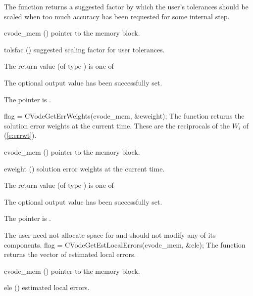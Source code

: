 {
  The function  returns a
  suggested factor by which the user's tolerances 
  should be scaled when too much accuracy has been 
  requested for some internal step.
}
{
  \begin{args}
  \item[cvode\_mem] ()
    pointer to the {\cvode} memory block.
  \item[tolsfac] ()
    suggested scaling factor for user tolerances.
  \end{args}
}
{
  The return value  (of type ) is one of
  \begin{args}
  \item[\Id{CV\_SUCCESS}] 
    The optional output value has been successfully set.
  \item[\Id{CV\_MEM\_NULL}]
    The  pointer is .
  \end{args}
}
{}
{
  flag = CVodeGetErrWeights(cvode\_mem, \&eweight);
}
{
  The function  returns the solution error weights 
  at the current time. These are the reciprocals of the $W_i$ of (\ref{e:errwt}).
}
{
  \begin{args}
  \item[cvode\_mem] ()
    pointer to the {\cvode} memory block.
  \item[eweight] ()
    solution error weights at the current time.
  \end{args}
}
{
  The return value  (of type ) is one of
  \begin{args}
  \item[\Id{CV\_SUCCESS}] 
    The optional output value has been successfully set.
  \item[\Id{CV\_MEM\_NULL}]
    The  pointer is .
  \end{args}
}
{
  The user need not allocate space for  and should not modify
  any of its components.
}
{
  flag = CVodeGetEstLocalErrors(cvode\_mem, \&ele);
}
{
  The function  returns the
  vector of estimated local errors.
}
{
  \begin{args}
  \item[cvode\_mem] ()
    pointer to the {\cvode} memory block.
  \item[ele] ()
    estimated local errors.
  \end{args}
}
